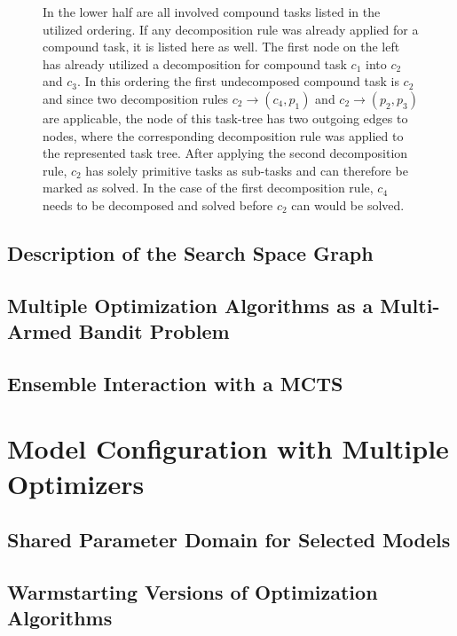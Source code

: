 \begin{figure}[ht!]
{    In the lower half are all involved compound tasks listed in the utilized ordering.
    If any decomposition rule was already applied for a compound task, it is listed here as well.
    The first node on the left has already utilized a decomposition for compound task $c_1$ into $c_2$ and $c_3$.
    In this ordering the first undecomposed compound task is $c_2$ and since two decomposition rules $c_2 \rightarrow (c_4, p_1)$ and $c_2 \rightarrow (p_2, p_3)$ are applicable, the node of this task-tree has two outgoing edges to nodes, where the corresponding decomposition rule was applied to the represented task tree.
    After applying the second decomposition rule, $c_2$ has solely primitive tasks as sub-tasks and can therefore be marked as solved.
    In the case of the first decomposition rule, $c_4$ needs to be decomposed and solved before $c_2$ can would be solved.
    }
    \label{fig:appraoch:htn-planning}
\end{figure}

\subsection{Description of the Search Space Graph}
\label{sec:appraoch:selection:graph}

\Blindtext

\subsection{Multiple Optimization Algorithms as a Multi-Armed Bandit Problem}
\label{sec:appraoch:selection:bandit}

\Blindtext

\subsection{Ensemble Interaction with a MCTS}
\label{sec:appraoch:selection:mcts}

\Blindtext

\section{Model Configuration with Multiple Optimizers}
\label{sec:approach:configuration}

\Blindtext

\subsection{Shared Parameter Domain for Selected Models}
\label{sec:appraoch:configuration:parameter}

\Blindtext

\subsection{Warmstarting Versions of Optimization Algorithms}
\label{sec:appraoch:configuration:warmstart}

\Blindtext